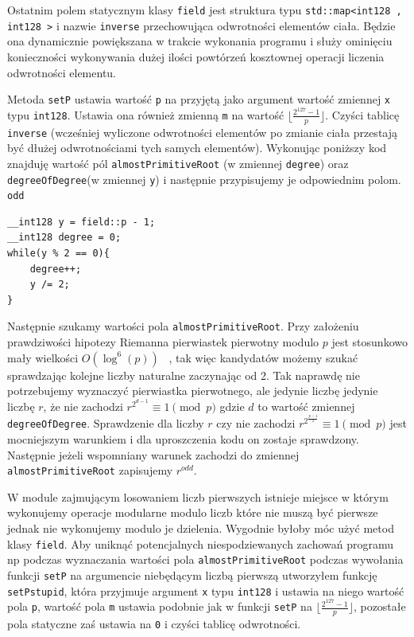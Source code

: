 \documentclass{article}
\begin{document}
Ostatnim polem statycznym klasy \texttt{field} jest struktura typu 
\texttt{std::map<\textunderscore \textunderscore int128 , \textunderscore \textunderscore int128 >} i nazwie 
\texttt{inverse} przechowująca odwrotności elementów ciała. Będzie ona dynamicznie powiększana w trakcie wykonania 
programu i służy ominięciu konieczności wykonywania dużej ilości powtórzeń kosztownej operacji liczenia odwrotności
elementu. 



Metoda \texttt{setP} ustawia wartość 
\texttt{p} na przyjętą jako argument wartość zmiennej \texttt{x} typu 
\texttt{\textunderscore \textunderscore int128}. 
Ustawia ona również zmienną \texttt{m} na wartość $\lfloor \frac{2^{127}-1}{p} \rfloor$.
Czyści tablicę \texttt{inverse} (wcześniej wyliczone odwrotności elementów
po zmianie ciała przestają być dłużej odwrotnościami tych samych elementów).
Wykonując poniższy kod znajduję wartość pól \texttt{almostPrimitiveRoot} (w zmiennej \texttt{degree}) oraz 
\texttt{degreeOfDegree}(w zmiennej \texttt{y}) i następnie przypisujemy je odpowiednim polom.
\texttt{odd}
\begin{verbatim}
__int128 y = field::p - 1;
__int128 degree = 0;
while(y % 2 == 0){
    degree++;
    y /= 2;
}
\end{verbatim}

Następnie szukamy wartości pola \texttt{almostPrimitiveRoot}. 
Przy założeniu prawdziwości hipotezy Riemanna pierwiastek pierwotny modulo $p$ jest
stosunkowo mały wielkości $O(\log^6(p))$ ~\cite{durnoga2017large}, 
tak więc kandydatów możemy szukać sprawdzając kolejne liczby naturalne zaczynając od 2. 
Tak naprawdę nie potrzebujemy wyznaczyć pierwiastka pierwotnego, ale jedynie liczbę jedynie liczbę 
$r$, że nie zachodzi $r^{2^{d-1}} \equiv 1 \pmod p$ gdzie $d$ to wartość zmiennej \texttt{degreeOfDegree}. Sprawdzenie dla liczby $r$ czy nie zachodzi 
$r^{2^\frac{p-1}{2}} \equiv 1 \pmod p$ jest mocniejszym warunkiem i dla uproszczenia kodu on zostaje sprawdzony. Następnie
jeżeli wspomniany warunek zachodzi do zmiennej \texttt{almostPrimitiveRoot} zapisujemy $r^{odd}$.

W module zajmującym losowaniem liczb pierwszych istnieje miejsce w którym wykonujemy operacje modularne modulo liczb
które nie muszą być pierwsze jednak nie wykonujemy modulo je dzielenia. Wygodnie byłoby móc użyć metod klasy 
\texttt{field}. Aby uniknąć potencjalnych niespodziewanych zachowań programu np podczas wyznaczania wartości pola 
\texttt{almostPrimitiveRoot} podczas wywołania funkcji \texttt{setP} na 
argumencie niebędącym liczbą pierwszą utworzyłem funkcję \texttt{setPstupid}, która przyjmuje argument
\texttt{x} typu \texttt{\textunderscore \textunderscore int128} i ustawia na niego wartość
pola \texttt{p}, wartość pola \texttt{m} ustawia podobnie jak w funkcji \texttt{setP} na  
$\lfloor \frac{2^{127}-1}{p} \rfloor$, pozostałe pola statyczne zaś ustawia na \texttt{0} i czyści tablicę odwrotności.
\end{document}
